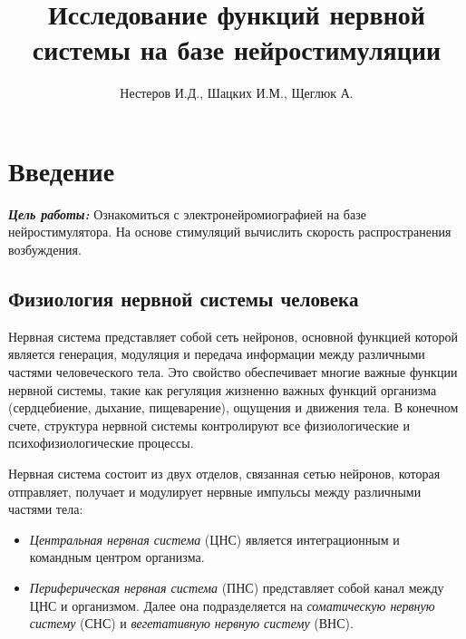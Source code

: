 \documentclass{article}
\title{Исследование функций нервной системы на базе нейростимуляции}
\author{Нестеров И.Д., Шацких И.М., Щеглюк А.}
\date{}
\begin{document}
    \maketitle
    \tableofcontents
    \newpage

    \section*{Введение}

        \hspace*{4mm}\textbf{\textit{Цель работы:}} Ознакомиться с электронейромиографией на базе нейростимулятора.
        На основе стимуляций вычислить скорость распространения возбуждения. 

        \subsection*{Физиология нервной системы человека}

        \hspace*{4mm} Нервная система представляет собой сеть нейронов, основной функцией
        которой является генерация, модуляция и передача информации между
        различными частями человеческого тела. Это свойство обеспечивает многие
        важные функции нервной системы, такие как регуляция жизненно важных
        функций организма (сердцебиение, дыхание, пищеварение), ощущения и
        движения тела. В конечном счете, структура нервной системы контролируют
        все физиологические и психофизиологические процессы.
        \vspace*{4mm}

        Нервная система состоит из двух отделов, связанная сетью нейронов,
        которая отправляет, получает и модулирует нервные импульсы между
        различными частями тела:

        \begin{itemize}
            \item \textit{Центральная нервная система} (ЦНС) является интеграционным и
            командным центром организма.

            \item \textit{Периферическая нервная система} (ПНС) представляет собой канал
            между ЦНС и организмом. Далее она подразделяется на \textit{соматическую
            нервную систему} (СНС) и \textit{вегетативную нервную систему} (ВНС).
        \end{itemize}
\end{document}
